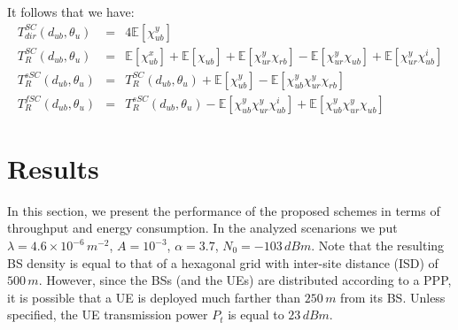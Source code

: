 \documentclass[12pt, letterpaper, onecolumn, draftcls]{IEEEtran}
\begin{document}
It follows that we have:
\begin{eqnarray}
 T_{dir}^{SC}(d_{ub},\theta_u) & = & 4\mathbb{E}\left[\chi_{ub}^y\right]\label{TdirSC}\\
 T_R^{SC}(d_{ub},\theta_u) & = & \mathbb{E}\left[\chi_{ub}^x\right] + \mathbb{E}\left[\chi_{ub}\right] + \mathbb{E}\left[\chi_{ur}^y\chi_{rb}\right] - \mathbb{E}\left[\chi_{ur}^y\chi_{ub}\right] + \mathbb{E}\left[\chi_{ur}^y\chi_{ub}^i\right]\label{TrelSC}\\
 T_R^{sSC}(d_{ub},\theta_u) & = & T_R^{SC}(d_{ub},\theta_u) + \mathbb{E}\left[\chi_{ub}^y\right] - \mathbb{E}\left[\chi_{ub}^y\chi_{ur}^y\chi_{rb}\right]\label{TrelsSC}\\
 T_R^{fSC}(d_{ub},\theta_u) & = & T_R^{sSC}(d_{ub},\theta_u) - \mathbb{E}\left[\chi_{ub}^y\chi_{ur}^y\chi_{ub}^i\right] + \mathbb{E}\left[\chi_{ub}^y\chi_{ur}^y\chi_{ub}\right]\label{TrelfSC}
\end{eqnarray}


\section{Results}
\label{results}
In this section, we present the performance of the proposed schemes in terms of throughput and energy consumption. In the analyzed scenarions we put $\lambda=4.6\times10^{-6}\,m^{-2}$, $A = 10^{-3}$, $\alpha = 3.7$, $N_0=-103\,dBm$.
Note that the resulting BS density is equal to that of a hexagonal grid with inter-site distance (ISD) of $500\,m$. However, since the BSs (and the UEs) are distributed according to a PPP, it is possible that a UE is deployed much farther than $250\,m$ from its BS. Unless specified, the UE transmission power $P_t$ is equal to $23\,dBm$.
\end{document}

